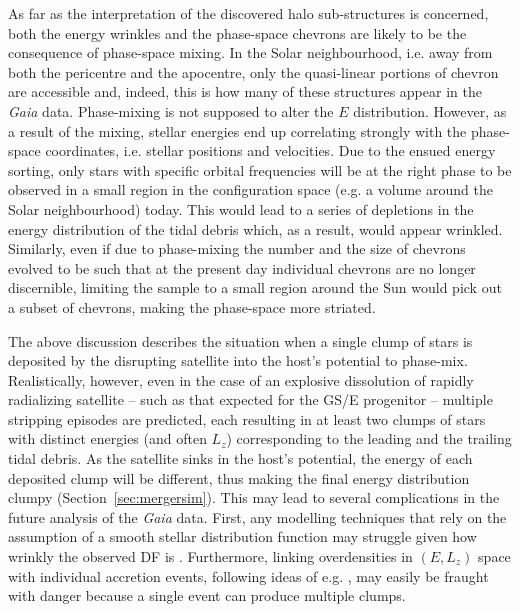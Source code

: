 \documentclass[a4paper,useAMS,usenatbib]{mnras}
\begin{document}
As far as the interpretation of the discovered halo sub-structures is concerned, both the energy wrinkles and the phase-space chevrons are likely to be the consequence of phase-space mixing. In the Solar neighbourhood, i.e. away from both the pericentre and the apocentre, only the quasi-linear portions of chevron are accessible and, indeed, this is how many of these structures appear in the {\it Gaia} data. Phase-mixing is not supposed to alter the $E$ distribution. However, as a result of the mixing, stellar energies end up correlating strongly with the phase-space coordinates, i.e. stellar positions and velocities.  Due to the ensued energy sorting, only stars with specific orbital frequencies will be at the right phase to be observed in a small region in the configuration space (e.g. a volume around the Solar neighbourhood) today. This would lead to a series of depletions in the energy distribution of the tidal debris which, as a result, would appear wrinkled. Similarly, even if due to phase-mixing the number and the size of chevrons evolved to be such that at the present day individual chevrons are no longer discernible, limiting the sample to a small region around the Sun would pick out a subset of chevrons, making the phase-space more striated.

The above discussion describes the situation when a single clump of stars is deposited by the disrupting satellite into the host's potential to phase-mix. Realistically, however, even in the case of an explosive dissolution of rapidly radializing satellite -- such as that expected for the GS/E progenitor -- multiple stripping episodes are predicted, each resulting in at least two clumps of stars with distinct energies (and often $L_z$) corresponding to the leading and the trailing tidal debris. As the satellite sinks in the host's potential, the energy of each deposited clump will be different, thus making the final energy distribution clumpy (Section~\ref{sec:mergersim}). This may lead to several complications in the future analysis of the {\it Gaia} data. First, any modelling techniques that rely on the assumption of a smooth stellar distribution function \citep[e.g.][]{Leonard1990} may struggle given how wrinkly the observed DF is \citep[see][]{Grand2019}. Furthermore, linking overdensities in $(E, L_z)$ space with individual accretion events, following ideas of e.g. \citet{Helmi2000}, may easily be fraught with danger because a single event can produce multiple clumps.
\end{document}

